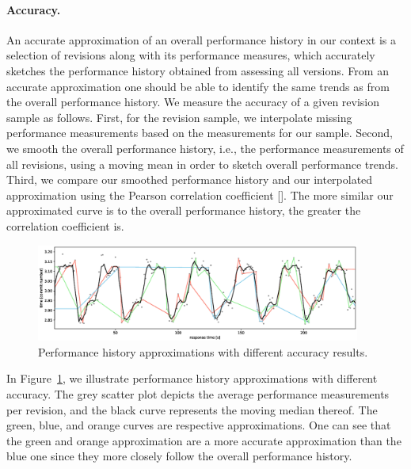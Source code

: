 \paragraph{Accuracy.} An accurate approximation of an overall performance
history in our context is a selection of revisions along with its performance measures, which accurately
sketches the performance history obtained from assessing all versions. From an
accurate approximation one should be able to identify the same trends as from
the overall performance history. We measure the accuracy of a given revision
sample as follows. First, for the revision sample, we interpolate missing
performance measurements based on the measurements for our sample. Second, we
smooth the overall performance history, i.e., the performance measurements of
all revisions, using a moving mean in order to sketch overall performance
trends. Third, we compare our smoothed performance history and our interpolated
approximation using the Pearson correlation coefficient []. The more similar
our approximated curve is to the overall performance history, the greater the
correlation coefficient is. 

\begin{figure}[h!]
	\centering
	\includegraphics[width=0.95\textwidth]{images/approximations.eps}
	\caption{Performance history approximations with different accuracy results.}
	\label{fig:approximation_accuracy}
\end{figure}

In Figure~\ref{fig:approximation_accuracy}, we illustrate performance history
approximations with different accuracy. The grey scatter plot depicts the
average performance measurements per revision, and the black curve represents
the moving median thereof. The green, blue, and orange curves are respective
approximations. One can see that the green and orange approximation are a more
accurate approximation than the blue one since they more closely follow the
overall performance history.

